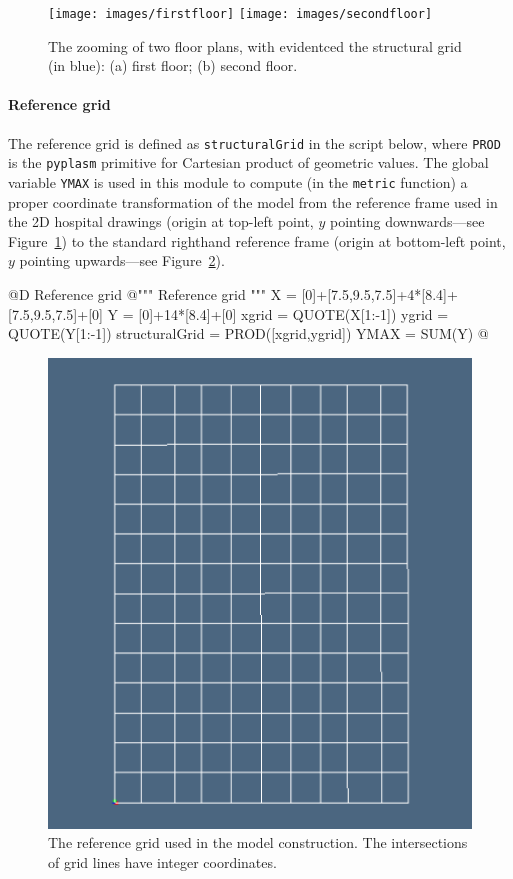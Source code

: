 \documentclass[11pt,oneside]{article}    %
\begin{document}
\begin{figure}[htbp] %
   \centering
   \texttt{[image: images/firstfloor]} 
   \texttt{[image: images/secondfloor]} 
   \caption{The zooming of two floor plans, with evidentced the structural grid (in blue): (a) first floor; (b) second floor.}
   \label{fig:referencegrid1}
\end{figure}

\paragraph{Reference grid}

The reference grid is defined as \texttt{structuralGrid} in the script below, where \texttt{PROD} is the \texttt{pyplasm} primitive for Cartesian product of geometric values. The global variable \texttt{YMAX} is used in this module to compute (in the \texttt{metric} function) a proper coordinate transformation of the model from the reference frame used in the 2D hospital drawings (origin at top-left point, $y$ pointing downwards---see Figure~\ref{fig:referencegrid1}) to the standard righthand reference frame (origin at bottom-left point, $y$ pointing upwards---see Figure~\ref{fig:referencegrid2}).

@D Reference grid
@{""" Reference grid """
X = [0]+[7.5,9.5,7.5]+4*[8.4]+[7.5,9.5,7.5]+[0]
Y = [0]+14*[8.4]+[0]
xgrid = QUOTE(X[1:-1])
ygrid = QUOTE(Y[1:-1])
structuralGrid = PROD([xgrid,ygrid])
YMAX = SUM(Y)
@}


\begin{figure}[htbp] %
   \centering
   \includegraphics[width=0.33\linewidth]{images/hospitalgrid} 
   \caption{The reference grid used in the model construction. The intersections of grid lines have integer coordinates.}
   \label{fig:referencegrid2}
\end{figure}
\end{document}
